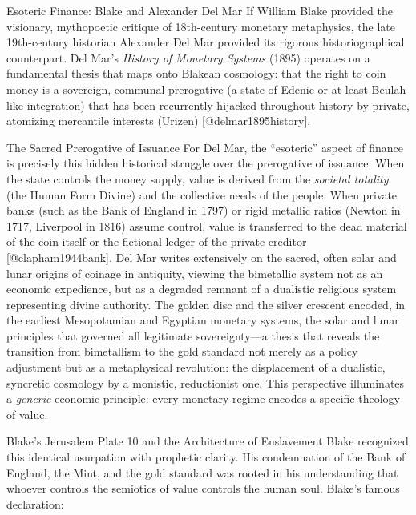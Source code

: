 \documentclass[
  ignorenonframetext,
]{beamer}
\author{\texorpdfstring{}{}}
\date{}
\begin{document}
\begin{frame}{Esoteric Finance: Blake and Alexander Del Mar}
\protect{}\label{esoteric-finance-blake-and-alexander-del-mar}
If William Blake provided the visionary, mythopoetic critique of
18th-century monetary metaphysics, the late 19th-century historian
Alexander Del Mar provided its rigorous historiographical counterpart.
Del Mar's \emph{History of Monetary Systems} (1895) operates on a
fundamental thesis that maps onto Blakean cosmology: that the right to
coin money is a sovereign, communal prerogative (a state of Edenic or at
least Beulah-like integration) that has been recurrently hijacked
throughout history by private, atomizing mercantile interests (Urizen)
{[}@delmar1895history{]}.

\begin{block}{The Sacred Prerogative of Issuance}
\protect{}\label{the-sacred-prerogative-of-issuance}
For Del Mar, the ``esoteric'' aspect of finance is precisely this hidden
historical struggle over the prerogative of issuance. When the state
controls the money supply, value is derived from the \emph{societal
totality} (the Human Form Divine) and the collective needs of the
people. When private banks (such as the Bank of England in 1797) or
rigid metallic ratios (Newton in 1717, Liverpool in 1816) assume
control, value is transferred to the dead material of the coin itself or
the fictional ledger of the private creditor {[}@clapham1944bank{]}. Del
Mar writes extensively on the sacred, often solar and lunar origins of
coinage in antiquity, viewing the bimetallic system not as an economic
expedience, but as a degraded remnant of a dualistic religious system
representing divine authority. The golden disc and the silver crescent
encoded, in the earliest Mesopotamian and Egyptian monetary systems, the
solar and lunar principles that governed all legitimate sovereignty---a
thesis that reveals the transition from bimetallism to the gold standard
not merely as a policy adjustment but as a metaphysical revolution: the
displacement of a dualistic, syncretic cosmology by a monistic,
reductionist one. This perspective illuminates a \emph{generic} economic
principle: every monetary regime encodes a specific theology of value.
\end{block}

\begin{block}{Blake's Jerusalem Plate 10 and the Architecture of
Enslavement}
\protect{}\label{blakes-jerusalem-plate-10-and-the-architecture-of-enslavement}
Blake recognized this identical usurpation with prophetic clarity. His
condemnation of the Bank of England, the Mint, and the gold standard was
rooted in his understanding that whoever controls the semiotics of value
controls the human soul. Blake's famous declaration:


\end{block}
\end{frame}
\end{document}
